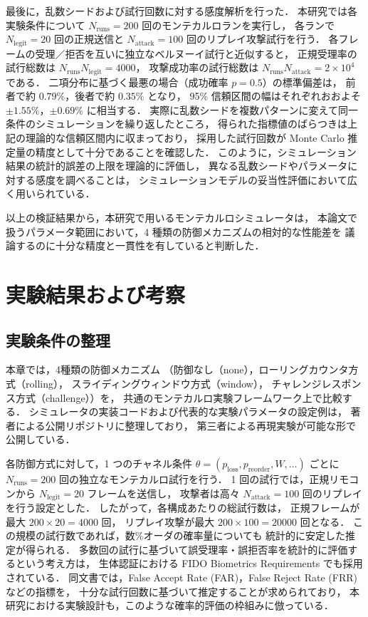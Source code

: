 \documentclass[twocolumn,10pt,a4paper]{jsarticle}
\begin{document}
最後に，乱数シードおよび試行回数に対する感度解析を行った．
本研究では各実験条件について $N_{\mathrm{runs}} = 200$ 回のモンテカルロランを実行し，
各ランで $N_{\mathrm{legit}} = 20$ 回の正規送信と
$N_{\mathrm{attack}} = 100$ 回のリプレイ攻撃試行を行う．
各フレームの受理／拒否を互いに独立なベルヌーイ試行と近似すると，
正規受理率の試行総数は $N_{\mathrm{runs}} N_{\mathrm{legit}} = 4000$，
攻撃成功率の試行総数は $N_{\mathrm{runs}} N_{\mathrm{attack}} = 2\times 10^4$ である．
二項分布に基づく最悪の場合（成功確率 $p=0.5$）の標準偏差は，
前者で約 $0.79\%$，後者で約 $0.35\%$ となり，
95\% 信頼区間の幅はそれぞれおおよそ $\pm 1.55\%$，$\pm 0.69\%$ に相当する．
実際に乱数シードを複数パターンに変えて同一条件のシミュレーションを繰り返したところ，
得られた指標値のばらつきは上記の理論的な信頼区間内に収まっており，
採用した試行回数が Monte Carlo 推定量の精度として十分であることを確認した．
このように，シミュレーション結果の統計的誤差の上限を理論的に評価し，
異なる乱数シードやパラメータに対する感度を調べることは，
シミュレーションモデルの妥当性評価において広く用いられている\cite{Sargent2013VVA,Kleijnen1995VV}．

以上の検証結果から，本研究で用いるモンテカルロシミュレータは，
本論文で扱うパラメータ範囲において，4 種類の防御メカニズムの相対的な性能差を
議論するのに十分な精度と一貫性を有していると判断した．

\section{実験結果および考察}
\label{sec:exp-results}

\subsection{実験条件の整理}
\label{sec:exp-overview}

本章では，4種類の防御メカニズム
（防御なし（none），ローリングカウンタ方式（rolling），
スライディングウィンドウ方式（window），
チャレンジレスポンス方式（challenge））を，
共通のモンテカルロ実験フレームワーク上で比較する．
シミュレータの実装コードおよび代表的な実験パラメータの設定例は，
著者による公開リポジトリに整理しており\cite{ReplaySimReadmeJP}，
第三者による再現実験が可能な形で公開している．

各防御方式に対して，1 つのチャネル条件
$\theta = (p_{\mathrm{loss}}, p_{\mathrm{reorder}}, W, \ldots)$ ごとに
$N_{\mathrm{runs}} = 200$ 回の独立なモンテカルロ試行を行う．
1 回の試行では，正規リモコンから
$N_{\mathrm{legit}} = 20$ フレームを送信し，
攻撃者は高々 $N_{\mathrm{attack}} = 100$ 回のリプレイを行う設定とした．
したがって，各構成あたりの総試行数は，
正規フレームが最大 $200 \times 20 = 4000$ 回，
リプレイ攻撃が最大 $200 \times 100 = 20000$ 回となる．
この規模の試行数であれば，数\%オーダの確率量についても
統計的に安定した推定が得られる．
多数回の試行に基づいて誤受理率・誤拒否率を統計的に評価するという考え方は，
生体認証における FIDO Biometrics Requirements でも採用されている\cite{FIDO-Bio}．
同文書では，False Accept Rate (FAR)，False Reject Rate (FRR) などの指標を，
十分な試行回数に基づいて推定することが求められており，
本研究における実験設計も，このような確率的評価の枠組みに倣っている．
\end{document}
